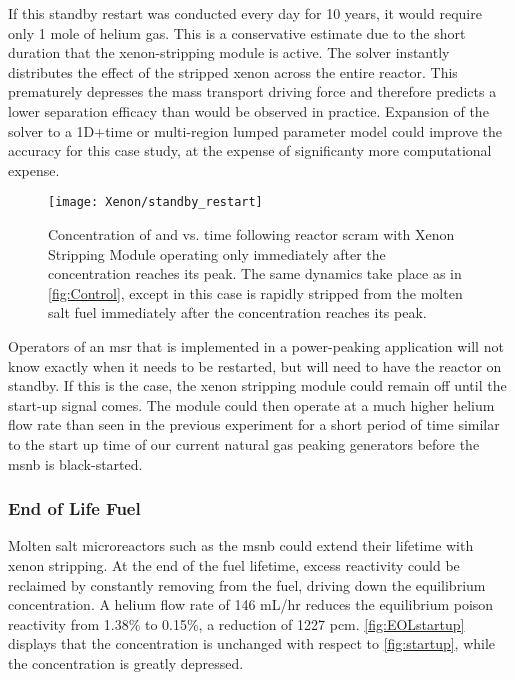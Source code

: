 If this standby restart was conducted every day for 10 years, it would require only 1 mole of helium gas. This is a conservative estimate due to the short duration that the xenon-stripping module is active. The solver instantly distributes the effect of the stripped xenon across the entire reactor. This prematurely depresses the mass transport driving force and therefore predicts a lower separation efficacy than would be observed in practice. Expansion of the solver to a 1D+time or multi-region lumped parameter model could improve the accuracy for this case study, at the expense of significanty more computational expense.

\begin{figure}[ht!]
    \centering
    \texttt{[image: Xenon/standby\_restart]}
    \caption[Concentration of \I and \Xe vs. time following reactor scram - Standby Mode]{Concentration of \I and \Xe vs. time following reactor scram with Xenon Stripping Module operating only immediately after the \Xe concentration reaches its peak. The same dynamics take place as in \cref{fig:Control}, except in this case \Xe is rapidly stripped from the molten salt fuel immediately after the \Xe concentration reaches its peak.}
    \label{fig:Standby}
\end{figure}

\newpage
Operators of an \acs{msr} that is implemented in a power-peaking application will not know exactly when it needs to be restarted, but will need to have the reactor on standby. If this is the case, the xenon stripping module could remain off until the start-up signal comes. The module could then operate at a much higher helium flow rate than seen in the previous experiment for a short period of time similar to the start up time of our current natural gas peaking generators \cite{GE} before the \acs{msnb} is black-started. 

\subsubsection{End of Life Fuel}\label{sec-EOL}
 Molten salt microreactors such as the \acs{msnb} could extend their lifetime with xenon stripping. At the end of the fuel lifetime, excess reactivity could be reclaimed by constantly removing \Xe from the fuel, driving down the equilibrium concentration. A helium flow rate of 146 mL/hr reduces the equilibrium poison reactivity from 1.38\% to 0.15\%, a reduction of 1227 pcm. \cref{fig:EOLstartup} displays that the \I concentration is unchanged with respect to \cref{fig:startup}, while the \Xe concentration is greatly depressed. 
 
